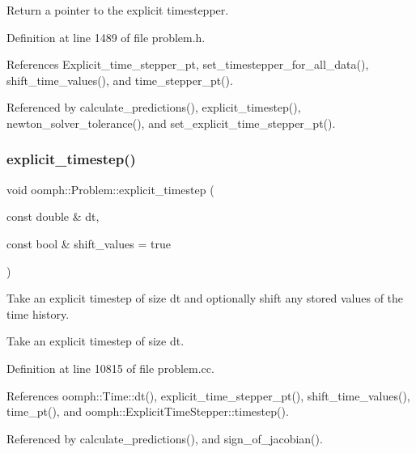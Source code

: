 Return a pointer to the explicit timestepper. 



Definition at line 1489 of file problem.\+h.



References Explicit\+\_\+time\+\_\+stepper\+\_\+pt, set\+\_\+timestepper\+\_\+for\+\_\+all\+\_\+data(), shift\+\_\+time\+\_\+values(), and time\+\_\+stepper\+\_\+pt().



Referenced by calculate\+\_\+predictions(), explicit\+\_\+timestep(), newton\+\_\+solver\+\_\+tolerance(), and set\+\_\+explicit\+\_\+time\+\_\+stepper\+\_\+pt().

\mbox{\label{classoomph_1_1Problem_ab8b74c5b1499b2d712a8545cccbd97c2}} 
\subsubsection{\texorpdfstring{explicit\+\_\+timestep()}{explicit\_timestep()}}
{\footnotesize\ttfamily void oomph\+::\+Problem\+::explicit\+\_\+timestep (\begin{DoxyParamCaption}\item[{const double \&}]{dt,  }\item[{const bool \&}]{shift\+\_\+values = {\ttfamily true} }\end{DoxyParamCaption})}



Take an explicit timestep of size dt and optionally shift any stored values of the time history. 

Take an explicit timestep of size dt. 

Definition at line 10815 of file problem.\+cc.



References oomph\+::\+Time\+::dt(), explicit\+\_\+time\+\_\+stepper\+\_\+pt(), shift\+\_\+time\+\_\+values(), time\+\_\+pt(), and oomph\+::\+Explicit\+Time\+Stepper\+::timestep().



Referenced by calculate\+\_\+predictions(), and sign\+\_\+of\+\_\+jacobian().

\mbox{\label{classoomph_1_1Problem_aa8df5552c706bd949b29f5601f8c941e}} 
